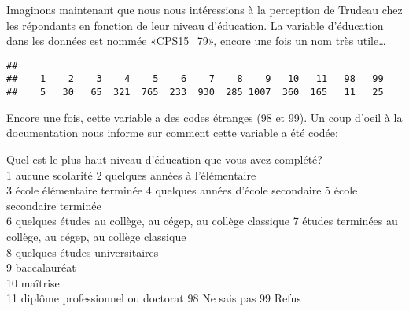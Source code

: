 \documentclass[
]{book}
\newenvironment{Shaded}{\begin{snugshade}}{\end{snugshade}}
\newcommand{\CommentTok}[1]{\textcolor[rgb]{0.56,0.35,0.01}{\textit{#1}}}
\newcommand{\ConstantTok}[1]{\textcolor[rgb]{0.00,0.00,0.00}{#1}}
\newcommand{\DecValTok}[1]{\textcolor[rgb]{0.00,0.00,0.81}{#1}}
\newcommand{\FunctionTok}[1]{\textcolor[rgb]{0.00,0.00,0.00}{#1}}
\newcommand{\NormalTok}[1]{#1}
\newcommand{\OtherTok}[1]{\textcolor[rgb]{0.56,0.35,0.01}{#1}}
\newcommand{\SpecialCharTok}[1]{\textcolor[rgb]{0.00,0.00,0.00}{#1}}
\begin{document}
\begin{Shaded}
\end{Shaded}

Imaginons maintenant que nous nous intéressions à la perception de Trudeau chez les répondants en fonction de leur niveau d'éducation. La variable d'éducation dans les données est nommée «CPS15\_79», encore une fois un nom très utile\ldots{}

\begin{Shaded}
\end{Shaded}

\begin{verbatim}
## 
##    1    2    3    4    5    6    7    8    9   10   11   98   99 
##    5   30   65  321  765  233  930  285 1007  360  165   11   25
\end{verbatim}

Encore une fois, cette variable a des codes étranges (98 et 99). Un coup d'oeil à la documentation nous informe sur comment cette variable a été codée:

Quel est le plus haut niveau d'éducation que vous avez complété?\\
1 aucune scolarité
2 quelques années à l'élémentaire\\
3 école élémentaire terminée
4 quelques années d'école secondaire
5 école secondaire terminée\\
6 quelques études au collège, au cégep, au collège classique
7 études terminées au collège, au cégep, au collège classique\\
8 quelques études universitaires\\
9 baccalauréat\\
10 maîtrise\\
11 diplôme professionnel ou doctorat
98 Ne sais pas
99 Refus
\end{document}
